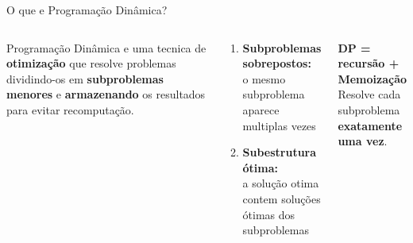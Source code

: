 \documentclass[aspectratio=169,10pt]{beamer}
\begin{document}
\begin{frame}{O que e Programação Dinâmica?}
  \begin{columns}[c]
      \begin{tcolorbox}[caixaDP,title={Definição}]
        \small
        Programação Dinâmica e uma tecnica de
        \textbf{otimização} que resolve problemas
        dividindo-os em \textbf{subproblemas menores}
        e \textbf{armazenando} os resultados para
        evitar recomputação.
      \end{tcolorbox}
      \vspace{0.10cm}
      \begin{tcolorbox}[caixaAzul,title={Dois ingredientes obrigatorios}]
        \begin{enumerate}\footnotesize
          \item \textbf{Subproblemas sobrepostos:}\\
                o mesmo subproblema aparece multiplas vezes
          \item \textbf{Subestrutura ótima:}\\
                a solução otima contem soluções\\
                ótimas dos subproblemas
        \end{enumerate}
      \end{tcolorbox}
      \vspace{0.10cm}
      \begin{tcolorbox}[caixaAmarelo,title={Resumo em uma linha}]
        \footnotesize
        \textbf{DP = recursão + Memoização}\\
        Resolve cada subproblema \textbf{exatamente uma vez}.
      \end{tcolorbox}
      \centering
\end{columns}
\end{frame}
\end{document}
